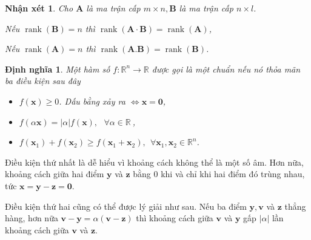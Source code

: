 \documentclass[12pt,a4paper,oneside]{report}
\newtheorem{nx}{Nhận xét}[section]
\newtheorem{dn}{Định nghĩa}[section]
\numberwithin{equation}{section}
\def\R{\mathbb{R}}
\begin{document}
\begin{nx}Cho $\mathbf{A}$ là ma trận cấp $m \times n, \mathbf{B}$ là ma trận cấp $n \times l$.

	 \item[(i)] Nếu $\operatorname{rank}(\mathbf{B})=n$ thì $\operatorname{rank}(\mathbf{A} \cdot \mathbf{B})=\operatorname{rank}(\mathbf{A})$,
	
	 \item[(ii)] Nếu $\operatorname{rank}(\mathbf{A})=n$ thì $\operatorname{rank}(\mathbf{A} . \mathbf{B})=\operatorname{rank}(\mathbf{B})$.

\end{nx}
\begin{dn}\cite{tiep2018}
	Một hàm số $f: \R^n \rightarrow \R$ được gọi là một chuẩn nếu nó thỏa mãn ba
	điều kiện sau đây
	\begin{itemize}
		
		\item[(i)] $f(\mathbf{x}) \geq 0$. Dấu bằng xảy ra $\Leftrightarrow \mathbf{x = 0} $,
		
		\item[(ii)] $f(\alpha \mathbf{x}) = |\alpha| f(\mathbf{x}), ~~~\forall \alpha \in \mathbb{R}\ $,
		
		\item[(iii)] $f(\mathbf{x}_1) + f(\mathbf{x}_2) \geq f(\mathbf{x}_1 + \mathbf{x}_2),
		~~\forall \mathbf{x}_1, \mathbf{x}_2 \in \mathbb{R}^n$.
		
\end{itemize}

\end{dn}

{Điều kiện thứ nhất} là dễ hiểu vì khoảng cách không thể là một số âm.
Hơn nữa, khoảng cách giữa hai điểm $\mathbf{y}$ và $\mathbf{z}$ bằng 0 khi và
chỉ khi hai điểm đó trùng nhau, tức $\mathbf{x = y - z = 0} $.

{Điều kiện thứ hai} cũng có thể được lý giải như sau. Nếu ba điểm
$\mathbf{y, v}$ và $\mathbf{z}$ thẳng hàng, hơn nữa
$\mathbf{v - y} = \alpha (\mathbf{v - z}) $ thì khoảng cách giữa $\mathbf{v}$ và
$\mathbf{y}$ gấp $ |\alpha |$ lần khoảng cách giữa $\mathbf{v}$ và
$\mathbf{z}$.
\end{document}
